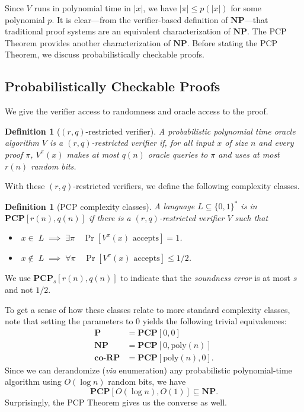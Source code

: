\documentclass{article}
\newtheorem{definition}[theorem]{Definition}
\newcommand{\poly}{{\mathrm{poly}}}
\newcommand{\bits}{\{0,1\}}
\newcommand{\class}[1]{\mathbf{#1}}
\newcommand{\coclass}[1]{\mathbf{co\mbox{-}#1}} %
\newcommand{\NP}{\class{NP}}
\newcommand{\PCP}{\class{PCP}}
\newcommand{\coRP}{\coclass{RP}}
\renewcommand{\P}{\class{P}}
\begin{document}
Since $V$ runs in polynomial time in $|x|$, we have
$|\pi| \le p(|x|)$ for some polynomial $p$.
It is clear---from the verifier-based definition of $\NP$---that traditional proof
systems are an equivalent characterization of $\NP$.
The PCP Theorem provides another characterization of $\NP$.
Before stating the PCP Theorem, we discuss probabilistically checkable proofs.

%
%
%
%
%
%


\subsection{Probabilistically Checkable Proofs}

We give the verifier access to randomness and oracle access to the proof.

\begin{definition}[$(r, q)$-restricted verifier]
A probabilistic polynomial time oracle algorithm $V$ is a \emph{$(r, q)$-restricted verifier} if,
for all input $x$ of size $n$ and every proof $\pi$, $V^\pi(x)$ makes at most $q(n)$ oracle queries
to $\pi$ and uses at most $r(n)$ random bits.
\end{definition}

With these $(r, q)$-restricted verifiers, we define the following complexity classes.

\begin{definition}[PCP complexity classes]
A language $L\subseteq\bits^*$ is in $\PCP[r(n), q(n)]$ if there is a
$(r, q)$-restricted verifier $V$ such that
\begin{itemize}[leftmargin=10em]
\item[\textbf{(Completeness)}] $\;x \in\; L \;\implies\; \exists \pi \quad \Pr[V^\pi(x) \text{ accepts}] = 1$.
\item[\textbf{(Soundness)}] $\;x \notin\; L \;\implies\; \forall \pi \quad \Pr[V^\pi(x) \text{ accepts}] \le 1/2$.
\end{itemize}
\end{definition}
We use $\PCP_s[r(n), q(n)]$ to indicate that the \emph{soundness error} is at most $s$
and not $1/2$.

To get a sense of how these classes relate to more standard complexity classes,
note that setting the parameters to $0$ yields the following trivial equivalences:
\begin{align*}
\P &= \PCP[0, 0] \\
\NP &= \PCP[0, \poly(n)] \\
\coRP &= \PCP[\poly(n), 0].
\end{align*}
Since we can derandomize (\emph{via} enumeration) any probabilistic polynomial-time algorithm
using $O(\log n)$ random bits, we have
$$
\PCP[O(\log n), O(1)] \subseteq \NP.
$$
Surprisingly, the PCP Theorem gives us the converse as well.
\end{document}

